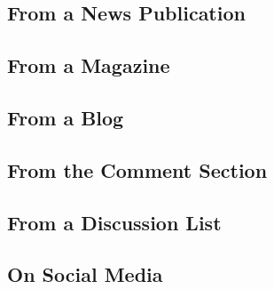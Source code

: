 \documentclass{article}
\begin{document}
\subsection{From a News Publication} %
\label{sub:from_a_news_publication}
\begin{refsection}
	\printbibliography[heading=none]
\end{refsection}
\subsection{From a Magazine} %
\label{sub:from_a_magazine}
\begin{refsection}
	\printbibliography[heading=none]
\end{refsection}
\subsection{From a Blog} %
\label{sub:from_a_blog}
\begin{refsection}
	\printbibliography[heading=none]
\end{refsection}
\subsection{From the Comment Section} %
\label{sub:from_the_comment_section}
\begin{refsection}
	\printbibliography[heading=none]
\end{refsection}
\subsection{From a Discussion List} %
\label{sub:from_a_discussion_list}
\begin{refsection}
	\printbibliography[heading=none]
\end{refsection}
\subsection{On Social Media} %
\label{sub:on_social_media}
\begin{refsection}
	\printbibliography[heading=none]
\end{refsection}
\end{document}

